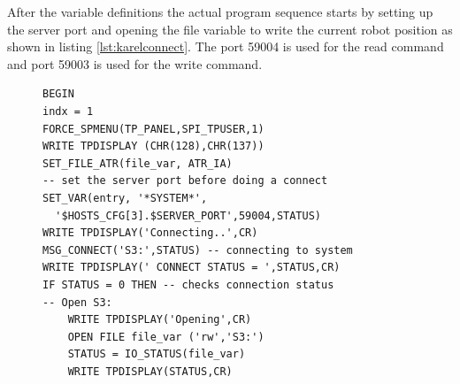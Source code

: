After the variable definitions the actual program sequence starts by setting up the server port and opening the file variable to write the current robot position as shown in listing \ref{lst:karelconnect}. The port 59004 is used for the read command and port 59003 is used for the write command.
\begin{figure}[H]
\begin{lstlisting}[frame = single, caption={KAREL start connection to client.}, captionpos=b, label={lst:karelconnect}]
BEGIN
indx = 1	
FORCE_SPMENU(TP_PANEL,SPI_TPUSER,1)
WRITE TPDISPLAY (CHR(128),CHR(137))
SET_FILE_ATR(file_var, ATR_IA)
-- set the server port before doing a connect
SET_VAR(entry, '*SYSTEM*',
  '$HOSTS_CFG[3].$SERVER_PORT',59004,STATUS)
WRITE TPDISPLAY('Connecting..',CR)
MSG_CONNECT('S3:',STATUS) -- connecting to system
WRITE TPDISPLAY(' CONNECT STATUS = ',STATUS,CR)
IF STATUS = 0 THEN -- checks connection status
-- Open S3:
	WRITE TPDISPLAY('Opening',CR)
	OPEN FILE file_var ('rw','S3:')
	STATUS = IO_STATUS(file_var)
	WRITE TPDISPLAY(STATUS,CR)
\end{lstlisting}
\end{figure}


